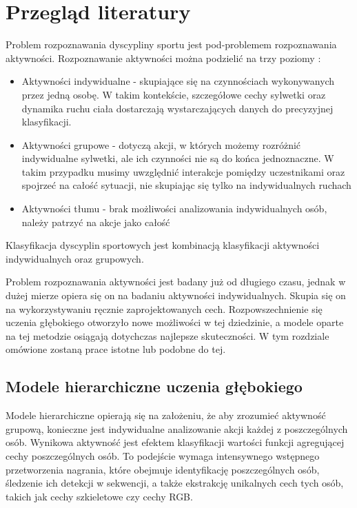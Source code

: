 \newpage %
\section{Przegląd literatury}
Problem rozpoznawania dyscypliny sportu jest pod-problemem rozpoznawania aktywności. Rozpoznawanie aktywności można podzielić na trzy poziomy \cite{Wu2021}:
\begin{itemize} 
\item Aktywności indywidualne -  skupiające się na czynnościach wykonywanych przez jedną osobę. W takim kontekście, szczegółowe cechy sylwetki oraz dynamika ruchu ciała dostarczają wystarczających danych do precyzyjnej klasyfikacji.
\item Aktywności grupowe - dotyczą akcji, w których możemy rozróżnić indywidualne sylwetki, ale ich czynności nie są do końca jednoznaczne. W takim przypadku musimy uwzględnić interakcje pomiędzy uczestnikami oraz spojrzeć na całość sytuacji, nie skupiając się tylko na indywidualnych ruchach
\item Aktywności tłumu - brak możliwości analizowania indywidualnych osób,  należy patrzyć na akcje jako całość
\end{itemize}
Klasyfikacja dyscyplin sportowych jest kombinacją klasyfikacji aktywności indywidualnych oraz grupowych. 

Problem rozpoznawania aktywności jest badany już od długiego czasu, jednak w dużej mierze opiera się on na badaniu aktywności indywidualnych. Skupia się on na wykorzystywaniu ręcznie zaprojektowanych cech. Rozpowszechnienie się uczenia głębokiego otworzyło nowe możliwości w tej dziedzinie, a modele oparte na tej metodzie osiągają dotychczas najlepsze skuteczności. W tym rozdziale omówione zostaną prace istotne lub podobne do tej.  

\subsection{Modele hierarchiczne uczenia głębokiego}
Modele hierarchiczne opierają się na założeniu, że aby zrozumieć aktywność grupową, konieczne jest indywidualne analizowanie akcji każdej z poszczególnych osób. Wynikowa aktywność jest efektem klasyfikacji wartości funkcji agregującej cechy poszczególnych osób. To podejście wymaga intensywnego wstępnego przetworzenia nagrania, które obejmuje identyfikację poszczególnych osób, śledzenie ich detekcji w sekwencji, a także ekstrakcję unikalnych cech tych osób, takich jak cechy szkieletowe czy cechy RGB.
